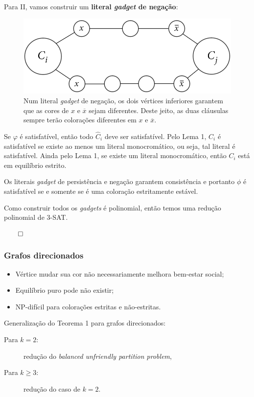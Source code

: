 \documentclass{beamer}
\newcommand{\ov}{\overline}
\theoremstyle{plain}
\newcommand{\gadget}{\textit{gadget}}
\newcommand{\bcolor}[1]{{\color{blue} #1}}
\begin{document}
\begin{frame}
  Para \bcolor{II}, vamos construir um \textbf{literal \gadget{} de negação}:

  \begin{figure}[h]
    \centering\includegraphics[scale=0.3]{imgs/negation.png}
    \captionsetup{justification=raggedright}
    \caption{Num literal \gadget{} de negação, os dois vértices inferiores garantem que as cores
    de $x$ e $\ov{x}$ sejam diferentes. Deste jeito, as duas cláusulas sempre terão colorações
    diferentes em $x$ e $\ov{x}$.}
  \end{figure}
\end{frame}

\begin{frame}

  {\color{blue}{5.}}

  Se $\varphi$ é satisfatível, então todo $\hat{C}_i$ deve ser satisfatível. Pelo Lema 1, $C_i$ é
  satisfatível se existe ao menos um literal monocromático, ou seja, tal literal é satisfatível.
  Ainda pelo Lema 1, se existe um literal monocromático, então $C_i$ está em equilíbrio estrito.

  Os literais \gadget{} de persistência e negação garantem consistência e portanto $\phi$ é
  satisfatível se e somente se é uma coloração estritamente estável.

  Como construir todos os \textit{gadgets} é polinomial, então temos uma redução polinomial de
  3-SAT\@.

  \hfill{}$\qed$
\end{frame}

\begin{frame}
  \frametitle{Grafos direcionados}

  \begin{itemize}
    \item Vértice mudar sua cor não necessariamente melhora bem-estar social;
    \item Equilíbrio puro pode não existir;
    \item NP-difícil para colorações estritas e não-estritas.
  \end{itemize}

  {\color{blue}Generalização do Teorema 1 para grafos direcionados:}

  \begin{description}
    \item[Para $k=2$:] redução do \textit{balanced unfriendly partition problem},
    \item[Para $k\geq 3$:] redução do caso de $k=2$.
  \end{description}
\end{frame}
\end{document}
